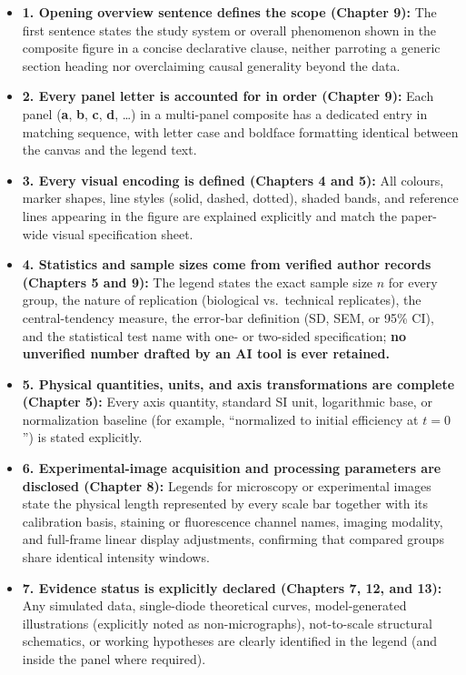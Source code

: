 \begin{itemize}
  \item[$\square$] \textbf{1. Opening overview sentence defines the scope (Chapter 9):} The first sentence states the study system or overall phenomenon shown in the composite figure in a concise declarative clause, neither parroting a generic section heading nor overclaiming causal generality beyond the data.
  \item[$\square$] \textbf{2. Every panel letter is accounted for in order (Chapter 9):} Each panel (\textbf{a}, \textbf{b}, \textbf{c}, \textbf{d}, \dots) in a multi-panel composite has a dedicated entry in matching sequence, with letter case and boldface formatting identical between the canvas and the legend text.
  \item[$\square$] \textbf{3. Every visual encoding is defined (Chapters 4 and 5):} All colours, marker shapes, line styles (solid, dashed, dotted), shaded bands, and reference lines appearing in the figure are explained explicitly and match the paper-wide visual specification sheet.
  \item[$\square$] \textbf{4. Statistics and sample sizes come from verified author records (Chapters 5 and 9):} The legend states the exact sample size $n$ for every group, the nature of replication (biological vs.\ technical replicates), the central-tendency measure, the error-bar definition (SD, SEM, or 95\% CI), and the statistical test name with one- or two-sided specification; \textbf{no unverified number drafted by an AI tool is ever retained.}
  \item[$\square$] \textbf{5. Physical quantities, units, and axis transformations are complete (Chapter 5):} Every axis quantity, standard SI unit, logarithmic base, or normalization baseline (for example, ``normalized to initial efficiency at $t = 0$'') is stated explicitly.
  \item[$\square$] \textbf{6. Experimental-image acquisition and processing parameters are disclosed (Chapter 8):} Legends for microscopy or experimental images state the physical length represented by every scale bar together with its calibration basis, staining or fluorescence channel names, imaging modality, and full-frame linear display adjustments, confirming that compared groups share identical intensity windows.
  \item[$\square$] \textbf{7. Evidence status is explicitly declared (Chapters 7, 12, and 13):} Any simulated data, single-diode theoretical curves, model-generated illustrations (explicitly noted as non-micrographs), not-to-scale structural schematics, or working hypotheses are clearly identified in the legend (and inside the panel where required).

\end{itemize}
